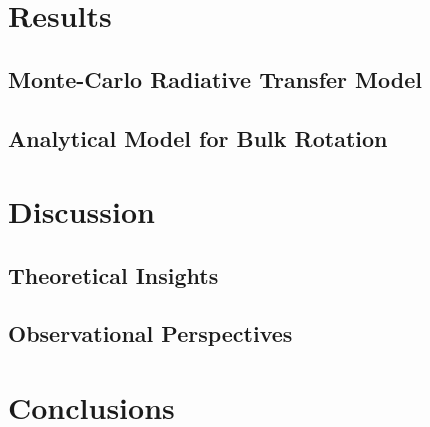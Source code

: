 \documentclass[a4,useAMS,usenatbib,usegraphicx]{mn2e}
\begin{document}
\section{Results}
\label{sec:results}

\subsection{Monte-Carlo Radiative Transfer Model}

\subsection{Analytical Model for Bulk Rotation}

\section{Discussion}
\label{sec:discussion}

\subsection{Theoretical Insights}

\subsection{Observational Perspectives}

\section{Conclusions}
\label{sec:conclusions}



\end{document}
